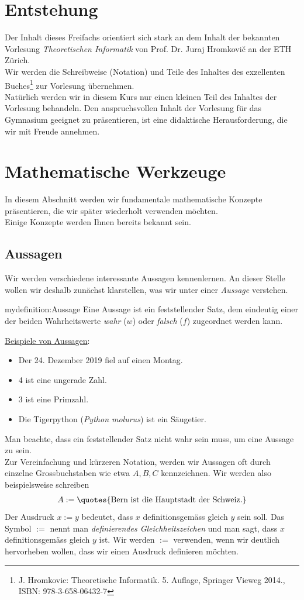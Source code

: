 \section{Entstehung}
Der Inhalt dieses Freifachs orientiert sich stark an dem Inhalt der bekannten Vorlesung \textit{Theoretischen Informatik} von Prof. Dr. Juraj Hromkovi\v{c} an der ETH Zürich.\\
Wir werden die Schreibweise (Notation) und Teile des Inhaltes des exzellenten Buches\footnote{J. Hromkovic: Theoretische Informatik. 5. Auflage, Springer Vieweg 2014., ISBN: 978-3-658-06432-7} zur Vorlesung übernehmen.\\
Natürlich werden wir in diesem Kurs nur einen kleinen Teil des Inhaltes der Vorlesung behandeln. Den anspruchsvollen Inhalt der Vorlesung für das Gymnasium geeignet zu präsentieren, ist eine didaktische Herausforderung, die wir mit Freude annehmen.

\section{Mathematische Werkzeuge}
In diesem Abschnitt werden wir fundamentale mathematische Konzepte präsentieren, die wir später wiederholt verwenden möchten.\\
Einige Konzepte werden Ihnen bereits bekannt sein.

\subsection{Aussagen}
Wir werden verschiedene interessante Aussagen kennenlernen. An dieser Stelle wollen wir deshalb zunächst klarstellen, was wir unter einer \textit{Aussage} verstehen.
\begin{mydefinition}[Aussage]{mydefinition:Aussage}
Eine Aussage ist ein feststellender Satz, dem eindeutig einer der beiden Wahrheitswerte \textit{wahr} ($w$) oder \textit{falsch} ($f$) zugeordnet werden kann.
\end{mydefinition}
\underline{Beispiele von Aussagen}:
\begin{itemize}
	\item Der 24. Dezember 2019 fiel auf einen Montag.
	\item 4 ist eine ungerade Zahl.
	\item 3 ist eine Primzahl.
	\item Die Tigerpython (\textit{Python molurus}) ist ein Säugetier.
\end{itemize}
Man beachte, dass ein feststellender Satz nicht wahr sein muss, um eine Aussage zu sein.\\
Zur Vereinfachung und kürzeren Notation, werden wir Aussagen oft durch einzelne Grossbuchstaben wie etwa $A, B, C$ kennzeichnen. Wir werden also beispielsweise schreiben
\begin{align}
	A := \text{\quotes{Bern ist die Hauptstadt der Schweiz.}}
\end{align}
Der Ausdruck $x := y$ bedeutet, dass $x$ definitionsgemäss gleich $y$ sein soll. Das Symbol $:=$ nennt man \textit{definierendes Gleichheitszeichen} und man sagt, dass $x$ definitionsgemäss gleich $y$ ist. Wir werden $:=$ verwenden, wenn wir deutlich hervorheben wollen, dass wir einen Ausdruck definieren möchten.

